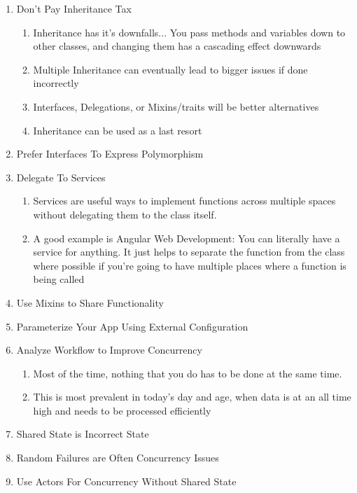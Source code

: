 \documentclass{article}
\begin{document}
\begin{enumerate}
\begin{enumerate}
        \end{enumerate}
    \item Don't Pay Inheritance Tax
        \begin{enumerate}
            \item Inheritance has it's downfalls... You pass methods and variables down to other classes, and changing them has a cascading effect downwards
            \item Multiple Inheritance can eventually lead to bigger issues if done incorrectly
            \item Interfaces, Delegations, or Mixins/traits will be better alternatives
            \item Inheritance can be used as a last resort
        \end{enumerate}
    \item Prefer Interfaces To Express Polymorphism
    \item Delegate To Services
        \begin{enumerate}
            \item Services are useful ways to implement functions across multiple spaces without delegating them to the class itself. 
            \item A good example is Angular Web Development: You can literally have a service for anything. It just helps to separate the function from the class where possible if you're going to have multiple places where a function is being called
        \end{enumerate}
    \item Use Mixins to Share Functionality
    \item Parameterize Your App Using External Configuration
    \item Analyze Workflow to Improve Concurrency
        \begin{enumerate}
            \item Most of the time, nothing that you do has to be done at the same time. 
            \item This is most prevalent in today's day and age, when data is at an all time high and needs to be processed efficiently
        \end{enumerate}
    \item Shared State is Incorrect State
    \item Random Failures are Often Concurrency Issues
    \item Use Actors For Concurrency Without Shared State
        \begin{enumerate}

\end{enumerate}
\end{enumerate}
\end{document}
